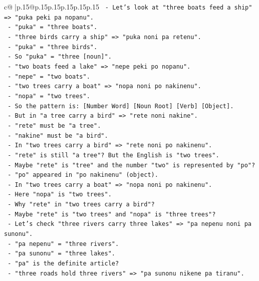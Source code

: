 \documentclass{article}
\begin{document}
{\begin{supertabular}{c@{$\;$}|p{.15\linewidth}@{}p{.15\linewidth}p{.15\linewidth}p{.15\linewidth}p{.15\linewidth}p{.15\linewidth}}
{{{\texttt{   {-} Let's look at "three boats feed a ship" => "puka peki pa nopanu".} \\
\texttt{   {-} "puka" = "three boats".} \\
\texttt{   {-} "three birds carry a ship" => "puka noni pa retenu".} \\
\texttt{   {-} "puka" = "three birds".} \\
\texttt{   {-} So "puka" = "three {[}noun{]}".} \\
\texttt{   {-} "two boats feed a lake" => "nepe peki po nopanu".} \\
\texttt{   {-} "nepe" = "two boats".} \\
\texttt{   {-} "two trees carry a boat" => "nopa noni po nakinenu".} \\
\texttt{   {-} "nopa" = "two trees".} \\
\texttt{   {-} So the pattern is: {[}Number Word{]} {[}Noun Root{]} {[}Verb{]} {[}Object{]}.} \\
\texttt{   {-} But in "a tree carry a bird" => "rete noni nakine".} \\
\texttt{   {-} "rete" must be "a tree".} \\
\texttt{   {-} "nakine" must be "a bird".} \\
\texttt{   {-} In "two trees carry a bird" => "rete noni po nakinenu".} \\
\texttt{   {-} "rete" is still "a tree"? But the English is "two trees".} \\
\texttt{   {-} Maybe "rete" is "tree" and the number "two" is represented by "po"?} \\
\texttt{   {-} "po" appeared in "po nakinenu" (object).} \\
\texttt{   {-} In "two trees carry a boat" => "nopa noni po nakinenu".} \\
\texttt{   {-} Here "nopa" is "two trees".} \\
\texttt{   {-} Why "rete" in "two trees carry a bird"?} \\
\texttt{   {-} Maybe "rete" is "two trees" and "nopa" is "three trees"?} \\
\texttt{   {-} Let's check "three rivers carry three lakes" => "pa nepenu noni pa sunonu".} \\
\texttt{   {-} "pa nepenu" = "three rivers".} \\
\texttt{   {-} "pa sunonu" = "three lakes".} \\
\texttt{   {-} "pa" is the definite article?} \\
\texttt{   {-} "three roads hold three rivers" => "pa sunonu nikene pa tiranu".} \\
}}}
\end{supertabular}}
\end{document}

